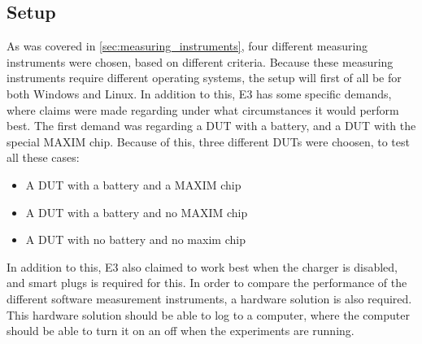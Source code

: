 \subsection{Setup}

As was covered in \cref*{sec:measuring_instruments}, four different measuring instruments were chosen, based on different criteria. Because these measuring instruments require different operating systems, the setup will first of all be for both Windows and Linux. In addition to this, E3 has some specific demands, where claims were made regarding under what circumstances it would perform best. The first demand was regarding a DUT with a battery, and a DUT with the special MAXIM chip. Because of this, three different DUTs were choosen, to test all these cases:

\begin{itemize}
    \item A DUT with a battery and a MAXIM chip
    \item A DUT with a battery and no MAXIM chip
    \item A DUT with no battery and no maxim chip
\end{itemize}

In addition to this, E3 also claimed to work best when the charger is disabled, and smart plugs is required for this. In order to compare the performance of the different software measurement instruments, a hardware solution is also required. This hardware solution should be able to log to a computer, where the computer should be able to turn it on an off when the experiments are running.